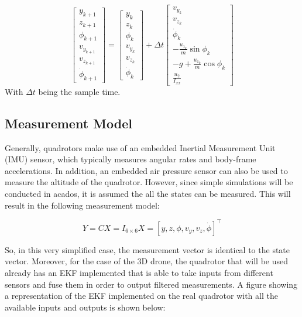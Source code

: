 \documentclass{thesisreport}
\begin{document}
\begin{equation}\label{evolution_model}
        \begin{bmatrix}
            y_{k+1} \\ z_{k+1} \\ \phi_{k+1} \\ v_{y_{k+1}} \\ v_{z_{k+1}} \\ \dot{\phi}_{k+1} 
        \end{bmatrix} = 
        \begin{bmatrix}
            y_{k} \\ z_{k} \\ \phi_{k} \\ v_{y_{k}} \\ v_{z_{k}} \\ \dot{\phi}_{k} 
        \end{bmatrix}
        + \Delta t \begin{bmatrix} 
            v_{y_{k}} \\ v_{z_{k}} \\ \dot{\phi}_{k} \\ -\frac{u_{1_k}}{m} \sin \phi_k \\ -g + \frac{u_{1_k}}{m} \cos \phi_k \\ \frac{u_2}{I_{xx}}
        \end{bmatrix}
    \end{equation}
With $\Delta t$ being the sample time.
    
	\subsection{Measurement Model}
	
	Generally, quadrotors make use of an embedded Inertial Measurement Unit (IMU) sensor, which typically measures angular rates and body-frame accelerations. In addition, an embedded air pressure sensor can also be used to measure the altitude of the quadrotor. However, since simple simulations will be conducted in acados, it is assumed the all the states can be measured. This will result in the following measurement model:
	
	\begin{equation}\label{measurement_model}
        Y = CX = I_{6 \times 6} X = [y, z, \phi, v_y, v_z, \dot{\phi}]^{\intercal}
    \end{equation}

So, in this very simplified case, the measurement vector is identical to the state vector.
Moreover, for the case of the 3D drone, the quadrotor that will be used already has an EKF implemented that is able to take inputs from different sensors and fuse them in order to output filtered measurements.
A figure showing a representation of the EKF implemented on the real quadrotor with all the available inputs and outputs is shown below:
\end{document}
